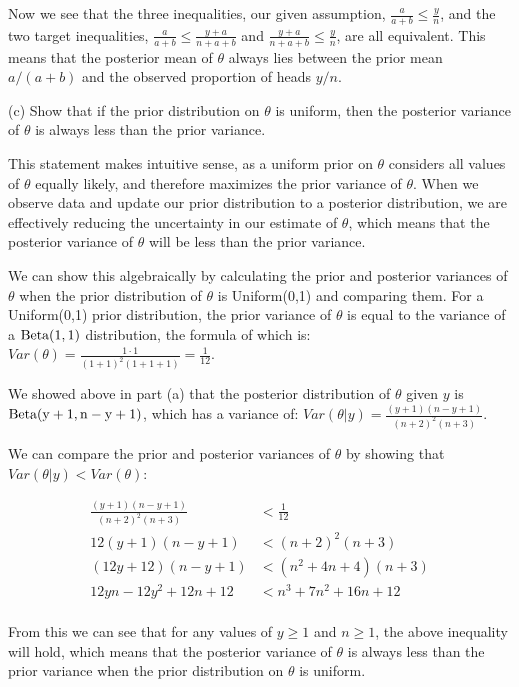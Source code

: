 \documentclass[12pt]{article}
\begin{document}
Now we see that the three inequalities, our given assumption, $\frac{a}{a + b} \leq \frac{y}{n}$,
and the two target inequalities, $\frac{a}{a + b} \leq \frac{y + a}{n + a + b}$ and $\frac{y + a}{n + a + b} \leq \frac{y}{n}$,
are all equivalent. This means that the posterior mean of $\theta$ always lies between the prior mean $a/(a+b)$ and the observed
proportion of heads $y/n$.

(c) Show that if the prior distribution on $\theta$ is uniform, then the posterior variance of $\theta$ is always less than the prior variance.

This statement makes intuitive sense, as a uniform prior on $\theta$ considers all values of $\theta$ equally likely, and therefore maximizes
the prior variance of $\theta$. When we observe data and update our prior distribution to a posterior distribution, we are effectively reducing
the uncertainty in our estimate of $\theta$, which means that the posterior variance of $\theta$ will be less than the prior variance.

We can show this algebraically by calculating the prior and posterior variances of $\theta$ when the prior distribution of
$\theta$ is Uniform(0,1) and comparing them. For a Uniform(0,1) prior distribution, the prior variance of $\theta$ is equal
to the variance of a $\rm Beta(1,1)$ distribution, the formula of which is: $Var(\theta) = \frac{1 \cdot 1}{(1 + 1)^2(1 + 1 + 1)} = \frac{1}{12}$.

We showed above in part (a) that the posterior distribution of $\theta$ given $y$ is $\rm Beta(y + 1, n - y + 1)$, which has a variance of:
$Var(\theta | y) = \frac{(y + 1)(n - y + 1)}{(n + 2)^2(n + 3)}$. 

We can compare the prior and posterior variances of $\theta$ by showing that $Var(\theta | y) < Var(\theta)$:

\begin{align*}
\frac{(y + 1)(n - y + 1)}{(n + 2)^2(n + 3)} &< \frac{1}{12} \\
12(y + 1)(n - y + 1) &< (n + 2)^2(n + 3) \\
(12y + 12)(n - y + 1) &< (n^2 + 4n + 4)(n + 3) \\
12yn - 12y^2 + 12n + 12 &< n^3 + 7n^2 + 16n + 12 \\
\end{align*}

From this we can see that for any values of $y \geq 1$ and $n \geq 1$, the above inequality will hold,
which means that the posterior variance of $\theta$ is always less than the prior variance when 
the prior distribution on $\theta$ is uniform.
\end{document}

